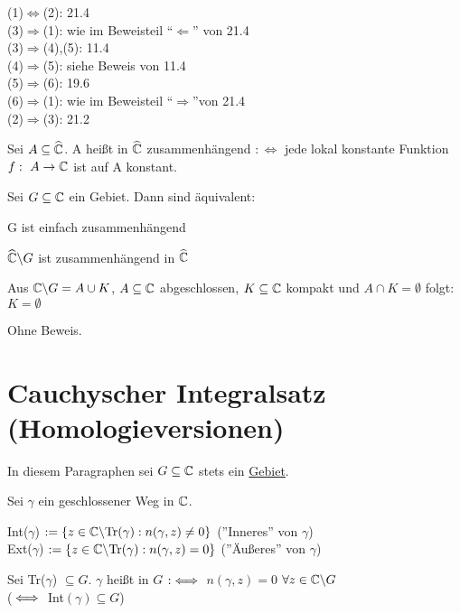 \documentclass[a4paper,twoside,DIV15,BCOR12mm]{scrbook}
\begin{document}
\begin{beweis}
(1)$\Leftrightarrow$(2): 21.4\\
(3)$\Rightarrow$(1): wie im Beweisteil "`$\Leftarrow$"' von 21.4\\
(3)$\Rightarrow$(4),(5): 11.4\\
(4)$\Rightarrow$(5): siehe Beweis von 11.4\\
(5)$\Rightarrow$(6): 19.6\\
(6)$\Rightarrow$(1): wie im Beweisteil "`$\Rightarrow$"'von 21.4\\
(2)$\Rightarrow$(3): 21.2 
\end{beweis}
\begin{definition}
Sei $A\subseteq\widehat{\mathbb{C}}$. A heißt in $\widehat{\mathbb{C}}$ zusammenhängend $:\Leftrightarrow$ jede lokal konstante Funktion $f:\ A\to\MdC$ ist auf A konstant.
\end{definition}
\begin{satz} 
Sei $G\subseteq\mathbb{C}$ ein Gebiet. Dann sind äquivalent: 
\begin{liste}
\item G ist einfach zusammenhängend
\item $\widehat{\mathbb{C}}\backslash G$ ist zusammenhängend in $\widehat{\mathbb{C}}$
\item Aus $\mathbb{C}\backslash G=A\cup K$, $A\subseteq\mathbb{C}$ abgeschlossen, $K\subseteq\mathbb{C}$ kompakt und $A\cap K=\emptyset$ folgt: $K=\emptyset$
\end{liste}
\end{satz}
\begin{beweis}
Ohne Beweis.\end{beweis}

\chapter{Cauchyscher Integralsatz (Homologieversionen)} 
In diesem Paragraphen sei $G \subseteq \mathbb{C}$ stets ein \underline{Gebiet}.
\begin{definition}
Sei $\gamma$ ein geschlossener Weg in $\mathbb{C}$. 
\begin{liste}
\item Int($\gamma$) $:= \{ z \in \mathbb{C} \backslash \text{Tr}(\gamma): n(\gamma,z)
\neq 0\}$ (''Inneres'' von $\gamma$)\\
Ext($\gamma$) $:= \{ z \in \mathbb{C} \backslash \text{Tr}(\gamma): n(\gamma,z)
= 0\}$ (''Äußeres'' von $\gamma$)
\item Sei Tr($\gamma$) $ \subseteq G$. $\gamma$ heißt in $G$
 $:\iff$ $n(\gamma,z) = 0$ $\forall z \in \mathbb{C} \backslash G$ \\
($\iff$ Int$(\gamma) \subseteq G$)
\end{liste}
\end{definition}
\end{document}
